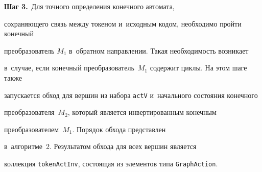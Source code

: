 \textbf{{Шаг 3.}}\ Для точного определения конечного автомата, 


сохраняющего связь между токеном и~исходным кодом, необходимо пройти конечный 


преобразователь $M_1$ в~обратном направлении. Такая необходимость возникает 


в~случае, если конечный преобразователь~$M_1$ содержит циклы. На этом шаге также 


запускается обход для вершин из набора \verb"actV"  и~начального состояния конечного 


преобразователя~$M_2$, который является инвертированным конечным 


преобразователем~$M_1$. Порядок обхода представлен 


в~алгоритме~2. Результатом обхода для всех вершин является 


коллекция \verb"tokenActInv", состоящая из элементов типа \verb"GraphAction".





